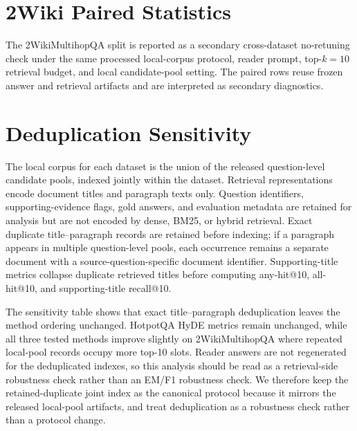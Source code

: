 \documentclass[pdflatex,sn-basic,Numbered]{sn-jnl}
\begin{document}


\section{2Wiki Paired Statistics}
\label{sec:supp_2wiki_paired_statistics}

The 2WikiMultihopQA split is reported as a secondary cross-dataset no-retuning check under the same processed local-corpus protocol, reader prompt, top-$k=10$ retrieval budget, and local candidate-pool setting. The paired rows reuse frozen answer and retrieval artifacts and are interpreted as secondary diagnostics.



\section{Deduplication Sensitivity}
\label{sec:supp_deduplication_sensitivity}

The local corpus for each dataset is the union of the released question-level candidate pools, indexed jointly within the dataset. Retrieval representations encode document titles and paragraph texts only. Question identifiers, supporting-evidence flags, gold answers, and evaluation metadata are retained for analysis but are not encoded by dense, BM25, or hybrid retrieval. Exact duplicate title--paragraph records are retained before indexing; if a paragraph appears in multiple question-level pools, each occurrence remains a separate document with a source-question-specific document identifier. Supporting-title metrics collapse duplicate retrieved titles before computing any-hit@10, all-hit@10, and supporting-title recall@10.



The sensitivity table shows that exact title--paragraph deduplication leaves the method ordering unchanged. HotpotQA HyDE metrics remain unchanged, while all three tested methods improve slightly on 2WikiMultihopQA where repeated local-pool records occupy more top-10 slots. Reader answers are not regenerated for the deduplicated indexes, so this analysis should be read as a retrieval-side robustness check rather than an EM/F1 robustness check. We therefore keep the retained-duplicate joint index as the canonical protocol because it mirrors the released local-pool artifacts, and treat deduplication as a robustness check rather than a protocol change.
\end{document}
